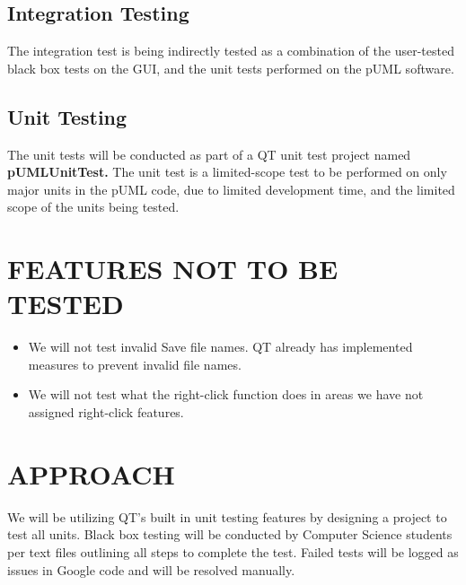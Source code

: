 \documentclass[twoside,letterpaper]{article}
\begin{document}
\subsection[]{\bfseries Integration Testing} 

The integration test is being indirectly tested as a combination of the user-tested black box tests on the GUI, and the unit tests performed on the pUML software.

\bigskip


\subsection[]{\bfseries Unit Testing} 

The unit tests will be conducted as part of a QT unit test project named {\bfseries pUMLUnitTest.} The unit test is a limited-scope test to be performed on only major units in the pUML code, due to limited development time, and the limited scope of the units being tested.

\bigskip


\section[FEATURES NOT TO BE TESTED]{\bfseries
FEATURES NOT TO BE TESTED}

\begin{itemize}
\item We will not test invalid Save file names. QT already has implemented measures to prevent invalid file names.
\item We will not test what the right-click function does in areas we have not assigned right-click features.
\end{itemize}



\section[APPROACH]{\bfseries APPROACH}

We will be utilizing QT's built in unit testing features by designing a project to test all units. 
Black box testing will be conducted by Computer Science students per text files outlining all steps to complete the test. Failed tests will be logged as issues in Google code and will be resolved manually.
\end{document}
